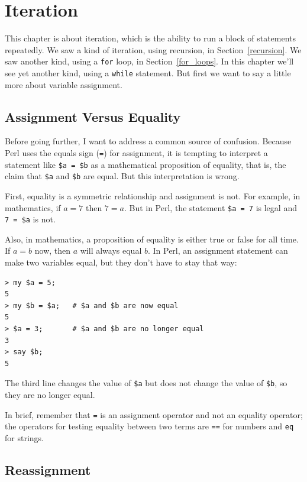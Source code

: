 
\chapter{Iteration}
\label{iteration}

This chapter is about iteration, which is the ability to run
a block of statements repeatedly.  We saw a kind of iteration,
using recursion, in Section~\ref{recursion}.
We saw another kind, using a {\tt for} loop,
in Section~\ref{for_loops}.  In this chapter we'll see yet another
kind, using a {\tt while} statement.
But first we want to say a little more about variable assignment.

\section{Assignment Versus Equality}

Before going further, I want to address a common source of confusion.
Because Perl uses the equals sign ({\tt =}) for assignment, it is
tempting to interpret a statement like {\tt \$a = \$b} as a
mathematical proposition of equality, that is, the claim that 
{\tt \$a} and {\tt \$b} are equal.  But this interpretation is 
wrong.

First, equality is a symmetric relationship and assignment is not.  For
example, in mathematics, if $a=7$ then $7=a$.  But in Perl, the
statement {\tt \$a = 7} is legal and {\tt 7 = \$a} is not.

Also, in mathematics, a proposition of equality is either true or
false for all time.  If $a=b$ now, then $a$ will always equal $b$.
In Perl, an assignment statement can make two variables equal, but
they don't have to stay that way:

\begin{verbatim}
> my $a = 5;
5
> my $b = $a;   # $a and $b are now equal
5
> $a = 3;       # $a and $b are no longer equal
3
> say $b;
5
\end{verbatim}
%
The third line changes the value of {\tt \$a} but does not 
change the value of {\tt \$b}, so they are no longer equal. 

In brief, remember that {\tt =} is an assignment operator and  
not an equality operator; the operators for testing equality 
between two terms are {\tt ==} for numbers and {\tt eq} for strings.

\section{Reassignment}

